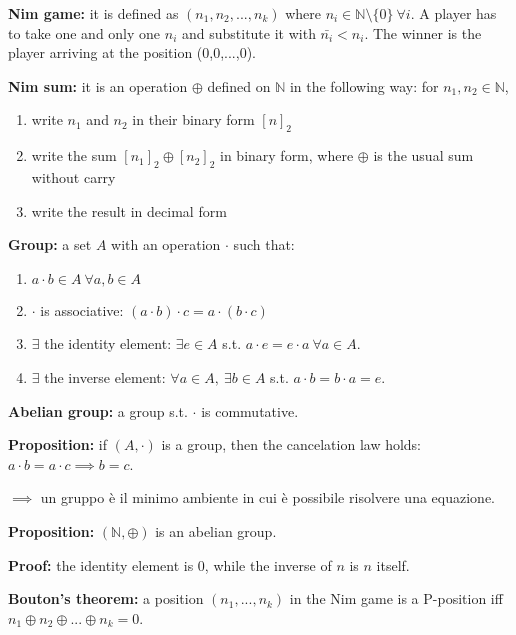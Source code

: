 \bigskip
\noindent \textbf{Nim game:} it is defined as $(n_1,n_2,...,n_k)$ where 
$n_i \in \mathbb{N}\setminus\{0\} ~\forall i$. A player has to take one and only 
one $n_i$ and substitute it with $\bar{n_i} < n_i$. The winner is the player 
arriving at the position (0,0,...,0).

\noindent \textbf{Nim sum:} it is an operation $\oplus$ defined on $\mathbb{N}$ 
in the following way: for $n_1,n_2 \in \mathbb{N}$,
\begin{enumerate}
	\item write $n_1$ and $n_2$ in their binary form $[n]_2$
	\item write the sum $[n_1]_2 \oplus [n_2]_2$ in binary form, where $\oplus$ 
	is the usual sum without carry
	\item write the result in decimal form
\end{enumerate}

\noindent \textbf{Group:} a set $A$ with an operation $\cdot$ such that:
\begin{enumerate}
	\item $a \cdot b \in A ~\forall a,b \in A$
	\item $\cdot$ is associative: $(a \cdot b) \cdot c = a \cdot (b \cdot c)$
	\item $\exists$ the identity element: $\exists e \in A$ s.t. 
	$a \cdot e = e \cdot a ~\forall a \in A$.
	\item $\exists$ the inverse element: $\forall a \in A, ~\exists b \in A$ 
	s.t. $a \cdot b = b \cdot a = e$.
\end{enumerate}
\textbf{Abelian group:} a group s.t. $\cdot$ is commutative.

\noindent \textbf{Proposition:} if $(A,\cdot)$ is a group, then the cancelation 
law holds: $a \cdot b = a \cdot c \implies b = c$.

\noindent $\implies$ un gruppo è il minimo ambiente in cui è possibile risolvere 
una equazione.

\noindent \textbf{Proposition:} $(\mathbb{N},\oplus)$ is an abelian group.

\noindent \textbf{Proof:} the identity element is 0, while the inverse of $n$ 
is $n$ itself.

\bigskip
\noindent \textbf{Bouton's theorem:} a position $(n_1,...,n_k)$ in the Nim game 
is a P-position iff $n_1 \oplus n_2 \oplus ... \oplus n_k = 0$.

